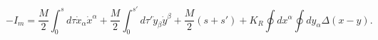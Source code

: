 \begin{equation}
\label{imink}
-I_m =\frac{M}{2}\int_0^{s}d\tau \dot{x}_{\alpha}\dot{x}^{\alpha}+\frac{M}{2}\int_0^{s'}d\tau '\dot{y}_{\beta}\dot{y}^{\beta}+\frac{M}{2}(s+s')+K_R\oint dx^{\alpha}\oint dy_{\alpha} \Delta (x-y). 
\end{equation}

